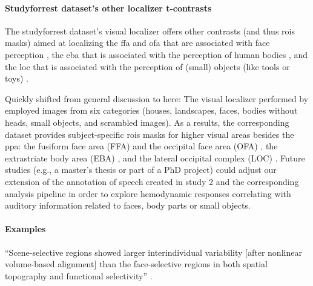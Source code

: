 \paragraph{Studyforrest dataset's other localizer t-contrasts}



%
The studyforrest dataset's visual localizer \citep{sengupta2016extension} offers
other contrasts (and thus \acp{roi} masks) aimed at localizing the \ac{ffa} and
\ac{ofa} that are associated with face perception \citep{kanwisher1997ffa,
pitcher2011occipitalfacearea}, the \ac{eba} that is associated with the
perception of human bodies \citep{downing2001bodyarea}, and the \ac{loc} that is
associated with the perception of (small) objects (like tools or toys)
\citep{malach1995loc}.

Quickly shifted from general discussion to here:
%
The visual localizer performed by \citet{sengupta2016extension} employed images
from six categories (houses, landscapes, faces, bodies without heads, small
objects, and scrambled images).
%
As a results, the corresponding dataset provides subject-specific \acp{roi}
masks for higher visual areas besides the \ac{ppa}:
%
the fusiform face area (FFA) \citep{kanwisher1997ffa} and the occipital face
area (OFA) \citep{pitcher2011occipitalfacearea},
%
the extrastriate body area (EBA) \citep{downing2001bodyarea},
%
and the lateral occipital complex (LOC) \citep{malach1995loc}.
%
Future studies (e.g., a master's thesis or part of a PhD project) could adjust
our extension of the annotation of speech created in study 2 and the
corresponding analysis pipeline in order to explore hemodynamic responses
correlating with auditory information related to faces, body parts or small
objects.


\paragraph{Examples}


``Scene-selective regions showed larger interindividual variability [after
nonlinear volume-based alignment] than the face-selective regions in both
spatial topography and functional selectivity'' \citet{zhen2017quantifying}.


